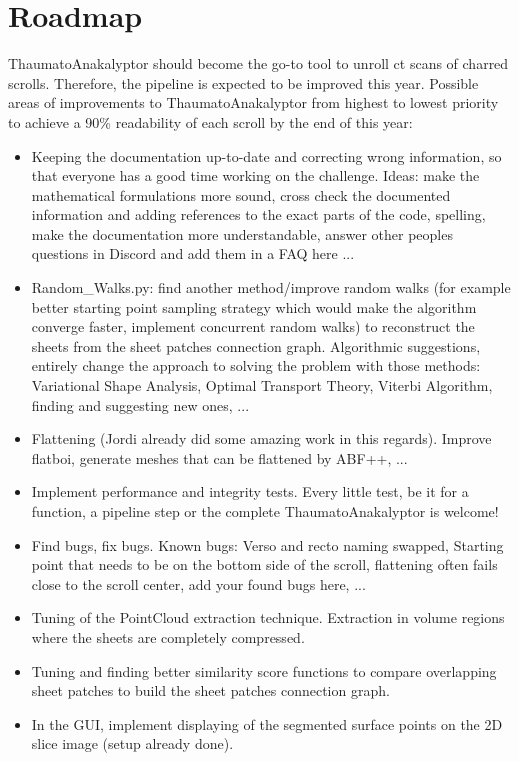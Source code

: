 \documentclass[peerreview]{IEEEtran}
\begin{document}
\section{Roadmap}
ThaumatoAnakalyptor should become the go-to tool to unroll ct scans of charred scrolls. Therefore, the pipeline is expected to be improved this year. 
Possible areas of improvements to ThaumatoAnakalyptor from highest to lowest priority to achieve a 90\% readability of each scroll by the end of this year:
\begin{itemize}  
\item Keeping the documentation up-to-date and correcting wrong information, so that everyone has a good time working on the challenge. Ideas: make the mathematical formulations more sound, cross check the documented information and adding references to the exact parts of the code, spelling, make the documentation more understandable, answer other peoples questions in Discord and add them in a FAQ here ...
\item Random\_Walks.py: find another method/improve random walks (for example better starting point sampling strategy which would make the algorithm converge faster, implement concurrent random walks) to reconstruct the sheets from the sheet patches connection graph. Algorithmic suggestions, entirely change the approach to solving the problem with those methods: Variational Shape Analysis, Optimal Transport Theory, Viterbi Algorithm, finding and suggesting new ones, ...
\item Flattening (Jordi already did some amazing work in this regards). Improve flatboi, generate meshes that can be flattened by ABF++, ...
\item Implement performance and integrity tests. Every little test, be it for a function, a pipeline step or the complete ThaumatoAnakalyptor is welcome!
\item Find bugs, fix bugs. Known bugs: Verso and recto naming swapped, Starting point that needs to be on the bottom side of the scroll, flattening often fails close to the scroll center, add your found bugs here, ... 
\item Tuning of the PointCloud extraction technique. Extraction in volume regions where the sheets are completely compressed.
\item Tuning and finding better similarity score functions to compare overlapping sheet patches to build the sheet patches connection graph.
\item In the GUI, implement displaying of the segmented surface points on the 2D slice image (setup already done).

\end{itemize}
\end{document}
